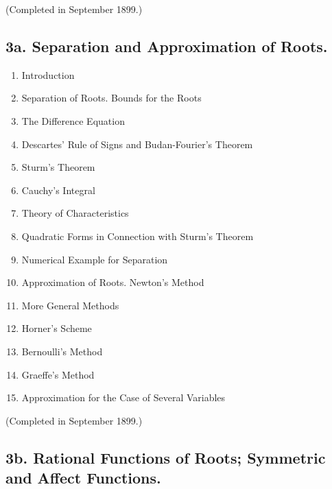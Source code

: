 \vspace{-0.1cm}
{\normalfont(Completed in September 1899.)}

\subsection*{\small3a. Separation and Approximation of Roots. }

\begin{enumerate}[itemsep=0pt]
    \item Introduction
    \item Separation of Roots. Bounds for the Roots
    \item The Difference Equation
    \item Descartes' Rule of Signs and Budan-Fourier's Theorem
    \item Sturm's Theorem
    \item Cauchy's Integral
    \item Theory of Characteristics
    \item Quadratic Forms in Connection with Sturm's Theorem
    \item Numerical Example for Separation
    \item Approximation of Roots. Newton's Method
    \item More General Methods
    \item Horner's Scheme
    \item Bernoulli's Method
    \item Graeffe's Method
    \item Approximation for the Case of Several Variables
\end{enumerate}

\vspace{-0.1cm}
{\normalfont(Completed in September 1899.)}

\subsection*{\small3b. Rational Functions of Roots; Symmetric and Affect Functions. \newline {}}

